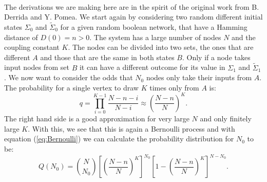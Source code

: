 \paragraph*{}
The derivations we are making here are in the spirit of the original work from B. Derrida and Y. Pomea. We start again by considering two random different initial states $\Sigma_0$ and $\tilde{\Sigma}_0$ for a given random boolean network, that have a Hamming distance of $D(0) = n > 0$. The system has a large number of nodes $N$ and the coupling constant $K$. The nodes can be divided into two sets, the ones that are different $A$ and those that are the same in both states $B$. Only if a node takes input nodes from set $B$ it can have a different outcome for its value in $\Sigma_1$ and $\tilde{\Sigma}_1$. We now want to consider the odds that $N_0$ nodes only take their inputs from $A$. The probability for a single vertex to draw $K$ times only from $A$ is:
\begin{equation}\label{eq:draw_from_one_set}
q = \prod\limits_{i = 0}^{K-1}\frac{N-n-i}{N-i} \approx \left(\frac{N-n}{N}\right)^K.
\end{equation}
The right hand side is a good approximation for very large $N$ and only finitely large $K$. With this, we see that this is again a Bernoulli process and with equation (\ref{eq:Bernoulli}) we can calculate the probability distribution for $N_0$ to be:
\begin{equation}
Q(N_0) = {N \choose N_0} \left[\left(\frac{N-n}{N}\right)^K\right]^{N_0}  \left[1-\left(\frac{N-n}{N}\right)^K\right]^{N-N_0}.
\end{equation}

